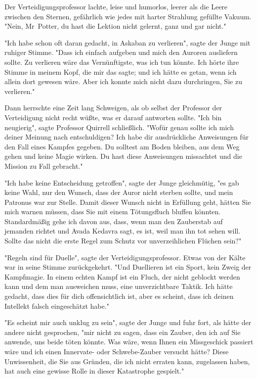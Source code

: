 {Der Verteidigungsprofessor lachte, leise und humorlos, leerer als die Leere zwischen den Sternen, gefährlich wie jedes mit harter Strahlung gefüllte Vakuum. "Nein, Mr~Potter, du hast die Lektion nicht gelernt, ganz und gar nicht."

"Ich habe schon oft daran gedacht, in Askaban zu verlieren", sagte der Junge mit ruhiger Stimme. "Dass ich einfach aufgeben und mich den Auroren ausliefern sollte. Zu verlieren wäre das Vernünftigste, was ich tun könnte. Ich hörte ihre Stimme in meinem Kopf, die mir das sagte; und ich hätte es getan, wenn ich allein dort gewesen wäre. Aber ich konnte mich nicht dazu durchringen, Sie zu verlieren."

Dann herrschte eine Zeit lang Schweigen, als ob selbst der Professor der Verteidigung nicht recht wüßte, was er darauf antworten sollte. "Ich bin neugierig", sagte Professor Quirrell schließlich. "Wofür genau sollte ich mich deiner Meinung nach entschuldigen? Ich habe dir ausdrückliche Anweisungen für den Fall eines Kampfes gegeben. Du solltest am Boden bleiben, aus dem Weg gehen und keine Magie wirken. Du hast diese Anweisungen missachtet und die Mission zu Fall gebracht."

"Ich habe keine Entscheidung getroffen", sagte der Junge gleichmütig, "es gab keine Wahl, nur den Wunsch, dass der Auror nicht sterben sollte, und mein Patronus war zur Stelle. Damit dieser Wunsch nicht in Erfüllung geht, hätten Sie mich warnen müssen, dass Sie mit einem Tötungsfluch bluffen könnten. Standardmäßig gehe ich davon aus, dass, wenn man den Zauberstab auf jemanden richtet und Avada Kedavra sagt, es ist, weil man ihn tot sehen will. Sollte das nicht die erste Regel zum Schutz vor unverzeihlichen Flüchen sein?"

"Regeln sind für Duelle", sagte der Verteidigungsprofessor. Etwas von der Kälte war in seine Stimme zurückgekehrt. "Und Duellieren ist ein Sport, kein Zweig der Kampfmagie. In einem echten Kampf ist ein Fluch, der nicht geblockt werden kann und dem man ausweichen muss, eine unverzichtbare Taktik. Ich hätte gedacht, dass dies für dich offensichtlich ist, aber es scheint, dass ich deinen Intellekt falsch eingeschätzt habe."

"Es scheint mir auch unklug zu sein", sagte der Junge und fuhr fort, als hätte der andere nicht gesprochen, "mir nicht zu sagen, dass ein Zauber, den ich auf Sie anwende, uns beide töten könnte. Was wäre, wenn Ihnen ein Missgeschick passiert wäre und ich einen Innervate- oder Schwebe-Zauber versucht hätte? Diese Unwissenheit, die Sie aus Gründen, die ich nicht erraten kann, zugelassen haben, hat auch eine gewisse Rolle in dieser Katastrophe gespielt."

}

